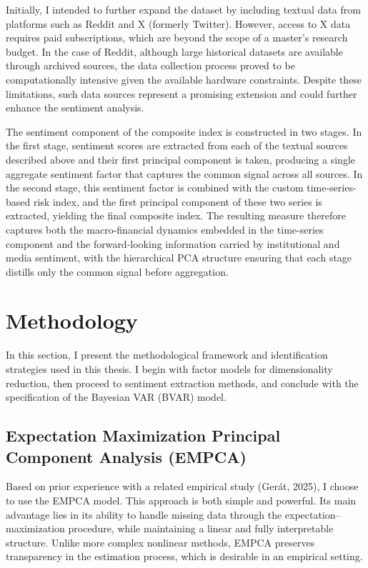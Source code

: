 \documentclass[12pt,a4paper]{report}\usepackage[a4paper, top=2.5cm, bottom=2.5cm, left=2.5cm, right=2.5cm]{geometry}
\begin{document}
Initially, I intended to further expand the dataset by including textual data from platforms such as Reddit and X (formerly Twitter). However, access to X data requires paid subscriptions, which are beyond the scope of a master's research budget. In the case of Reddit, although large historical datasets are available through archived sources, the data collection process proved to be computationally intensive given the available hardware constraints. Despite these limitations, such data sources represent a promising extension and could further enhance the sentiment analysis.

The sentiment component of the composite index is constructed in two stages. In the first stage, sentiment scores are extracted from each of the textual sources described above and their first principal component is taken, producing a single aggregate sentiment factor that captures the common signal across all sources. In the second stage, this sentiment factor is combined with the custom time-series-based risk index, and the first principal component of these two series is extracted, yielding the final composite index. The resulting measure therefore captures both the macro-financial dynamics embedded in the time-series component and the forward-looking information carried by institutional and media sentiment, with the hierarchical PCA structure ensuring that each stage distills only the common signal before aggregation.



\section{Methodology}
In this section, I present the methodological framework and identification strategies used in this thesis. I begin with factor models for dimensionality reduction, then proceed to sentiment extraction methods, and conclude with the specification of the Bayesian VAR (BVAR) model.

\subsection{Expectation Maximization Principal Component Analysis (EMPCA)}

Based on prior experience with a related empirical study (Gerát, 2025), I choose to use the EMPCA model. This approach is both simple and powerful. Its main advantage lies in its ability to handle missing data through the expectation–maximization procedure, while maintaining a linear and fully interpretable structure. Unlike more complex nonlinear methods, EMPCA preserves transparency in the estimation process, which is desirable in an empirical setting.
\end{document}
